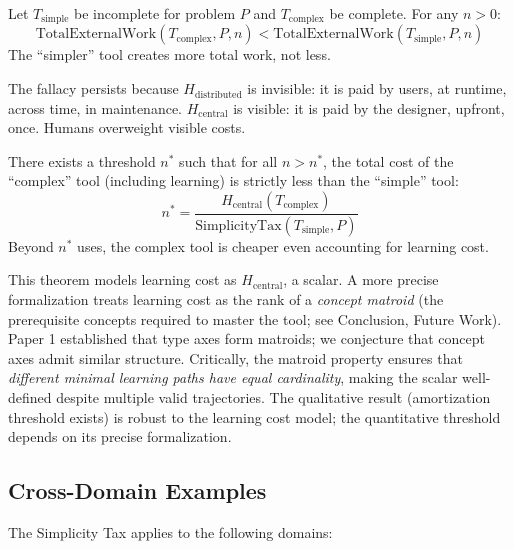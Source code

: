 \begin{theorem}\label{thm:fallacy}
Let $T_{\text{simple}}$ be incomplete for problem $P$ and $T_{\text{complex}}$ be complete. For any $n > 0$:
\[\text{TotalExternalWork}(T_{\text{complex}}, P, n) < \text{TotalExternalWork}(T_{\text{simple}}, P, n)\]
The ``simpler'' tool creates more total work, not less.
\end{theorem}

The fallacy persists because $H_{\text{distributed}}$ is invisible: it is paid by users, at runtime, across time, in maintenance. $H_{\text{central}}$ is visible: it is paid by the designer, upfront, once. Humans overweight visible costs.

\begin{theorem}\label{thm:amortization}
There exists a threshold $n^*$ such that for all $n > n^*$, the total cost of the ``complex'' tool (including learning) is strictly less than the ``simple'' tool:
\[n^* = \frac{H_{\text{central}}(T_{\text{complex}})}{\text{SimplicityTax}(T_{\text{simple}}, P)}\]
Beyond $n^*$ uses, the complex tool is cheaper even accounting for learning cost.
\end{theorem}

\begin{remark}
This theorem models learning cost as $H_{\text{central}}$, a scalar. A more precise formalization treats learning cost as the rank of a \emph{concept matroid} (the prerequisite concepts required to master the tool; see Conclusion, Future Work). Paper 1 established that type axes form matroids; we conjecture that concept axes admit similar structure. Critically, the matroid property ensures that \emph{different minimal learning paths have equal cardinality}, making the scalar well-defined despite multiple valid trajectories. The qualitative result (amortization threshold exists) is robust to the learning cost model; the quantitative threshold depends on its precise formalization.
\end{remark}

\subsection{Cross-Domain Examples}\label{sec:examples}

The Simplicity Tax applies to the following domains:

